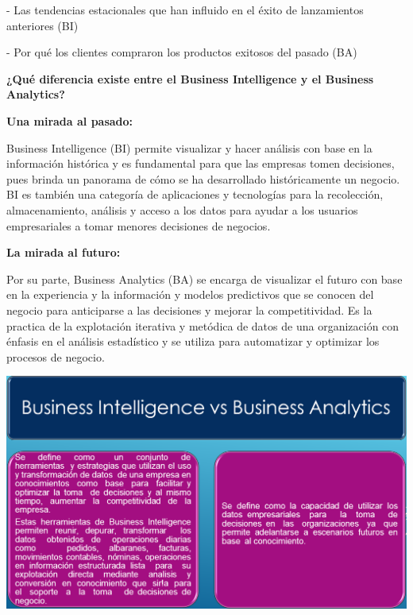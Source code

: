 \begin{flushleft}
\item 
- Las tendencias estacionales que han influido en el éxito de lanzamientos anteriores (BI)
\item 
- Por qué los clientes compraron los productos exitosos del pasado (BA)
\item
\item
\begin{center}
\textbf{¿Qué diferencia existe entre el Business Intelligence y el Business Analytics?}\\
\end{center}
\item
\item
\textbf{Una mirada al pasado:}\\
\item
Business Intelligence (BI) permite visualizar y hacer análisis con base en la información histórica y es fundamental para que las empresas tomen decisiones, pues brinda un panorama de cómo se ha desarrollado históricamente un negocio. BI es también una categoría de aplicaciones y tecnologías para la recolección, almacenamiento, análisis y acceso a los datos para ayudar a los usuarios empresariales a tomar menores decisiones de negocios.
\item
\item
\textbf{La mirada al futuro:}\\
\item
Por su parte, Business Analytics (BA) se encarga de visualizar el futuro con base en la experiencia y la información y modelos predictivos que se conocen del negocio para anticiparse a las decisiones y
mejorar la competitividad. Es la practica de la explotación iterativa y metódica de datos de una organización con énfasis en el análisis estadístico y se utiliza para automatizar y optimizar los procesos de negocio.
\item
\item
\begin{center}
\includegraphics[width=17cm]{./Imagenes/image03}

\end{center}
\end{flushleft}
